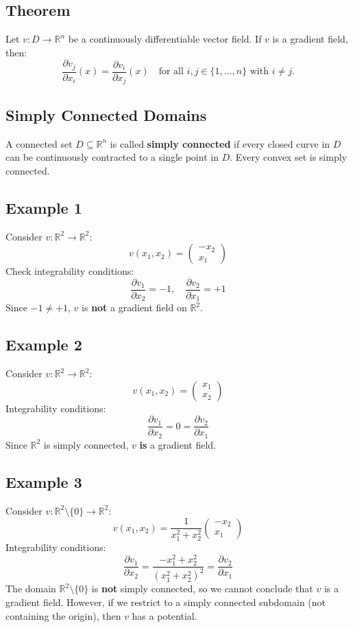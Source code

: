 \documentclass{article}
\begin{document}
\subsection*{Theorem}
Let \( v: D \rightarrow \mathbb{R}^n \) be a continuously differentiable vector field. If \( v \) is a gradient field, then:
\[
\frac{\partial v_j}{\partial x_i}(x) = \frac{\partial v_i}{\partial x_j}(x) \quad \text{for all } i,j \in \{1,\dots,n\} \text{ with } i \neq j.
\]

\subsection*{Simply Connected Domains}
A connected set \( D \subseteq \mathbb{R}^n \) is called \textbf{simply connected} if every closed curve in \( D \) can be continuously contracted to a single point in \( D \). Every convex set is simply connected.

\subsection*{Example 1}
Consider \( v : \mathbb{R}^2 \to \mathbb{R}^2 \):
\[
v(x_1, x_2) = \begin{pmatrix} -x_2 \\ x_1 \end{pmatrix}
\]
Check integrability conditions:
\[
\frac{\partial v_1}{\partial x_2} = -1, \quad \frac{\partial v_2}{\partial x_1} = +1
\]
Since \(-1 \neq +1\), \( v \) is \textbf{not} a gradient field on \( \mathbb{R}^2 \).

\subsection*{Example 2}
Consider \( v : \mathbb{R}^2 \to \mathbb{R}^2 \):
\[
v(x_1, x_2) = \begin{pmatrix} x_1 \\ x_2 \end{pmatrix}
\]
Integrability conditions:
\[
\frac{\partial v_1}{\partial x_2} = 0 = \frac{\partial v_2}{\partial x_1}
\]
Since \( \mathbb{R}^2 \) is simply connected, \( v \) \textbf{is} a gradient field.

\subsection*{Example 3}
Consider \( v : \mathbb{R}^2 \setminus \{0\} \to \mathbb{R}^2 \):
\[
v(x_1, x_2) = \frac{1}{x_1^2 + x_2^2} \begin{pmatrix} -x_2 \\ x_1 \end{pmatrix}
\]
Integrability conditions:
\[
\frac{\partial v_1}{\partial x_2} = \frac{-x_1^2 + x_2^2}{(x_1^2 + x_2^2)^2} = \frac{\partial v_2}{\partial x_1}
\]
The domain \( \mathbb{R}^2 \setminus \{0\} \) is \textbf{not} simply connected, so we cannot conclude that \( v \) is a gradient field. However, if we restrict to a simply connected subdomain (not containing the origin), then \( v \) has a potential.
\end{document}
